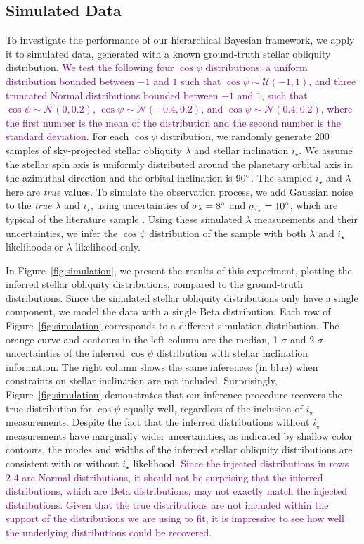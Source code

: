 \documentclass[twocolumn,times]{aastex631}
\newcommand{\edits}[1]{\textcolor{purple}{#1}}
\begin{document}
\subsection{Simulated Data}\label{subsec:sim}
To investigate the performance of our hierarchical Bayesian framework, we apply it to simulated data, generated with a known ground-truth stellar obliquity distribution.
\edits{We test the following four $\cos{\psi}$ distributions: a uniform distribution bounded between $-1$ and $1$ such that $\cos{\psi} \sim \mathcal{U}(-1,1)$, and three truncated Normal distributions bounded between $-1$ and $1$, such that $\cos{\psi} \sim \mathcal{N}(0, 0.2)$, $\cos{\psi} \sim \mathcal{N}(-0.4, 0.2)$, and $\cos{\psi} \sim \mathcal{N}(0.4, 0.2)$, where the first number is the mean of the distribution and the second number is the standard deviation.}
For each $\cos{\psi}$ distribution, we randomly generate 200 samples of sky-projected stellar obliquity $\lambda$ and stellar inclination $i_\star$. We assume the stellar spin axis is uniformly distributed around the planetary orbital axis in the azimuthal direction and the orbital inclination is $90\mbox{$^\circ$}$.
The sampled $i_\star$ and $\lambda$ here are \emph{true} values. 
To simulate the observation process, we add Gaussian noise to the \emph{true} $\lambda$ and $i_\star$, using uncertainties of $\sigma_{\lambda} = 8\mbox{$^\circ$}$ and $\sigma_{i_\star} = 10\mbox{$^\circ$}$, which are typical of the literature sample \cite{Albrecht22}.
Using these simulated $\lambda$ measurements and their uncertainties, we infer the $\cos{\psi}$ distribution of the sample with both $\lambda$ and $i_\star$ likelihoods or $\lambda$ likelihood only.

In Figure~\ref{fig:simulation}, we present the results of this experiment, plotting the inferred stellar obliquity distributions, compared to the ground-truth distributions.
Since the simulated stellar obliquity distributions only have a single component, we model the data with a single Beta distribution.
Each row of Figure~\ref{fig:simulation} corresponds to a different simulation distribution. The orange curve and contours in the left column are the median, 1-$\sigma$ and 2-$\sigma$ uncertainties of the inferred $\cos{\psi}$ distribution with stellar inclination information.
The right column shows the same inferences (in blue) when constraints on stellar inclination are not included.
Surprisingly, Figure~\ref{fig:simulation} demonstrates that our inference procedure recovers the true distribution for $\cos{\psi}$ equally well, regardless of the inclusion of $i_\star$ measurements.
Despite the fact that the inferred distributions without $i_\star$ measurements have marginally wider uncertainties, as indicated by shallow color contours, the modes and widths of the inferred stellar obliquity distributions are consistent with or without $i_\star$ likelihood.
\edits{Since the injected distributions in rows 2-4 are Normal distributions, it should not be surprising that the inferred distributions, which are Beta distributions, may not exactly match the injected distributions. Given that the true distributions are not included within the support of the distributions we are using to fit, it is impressive to see how well the underlying distributions could be recovered.}
\end{document}
